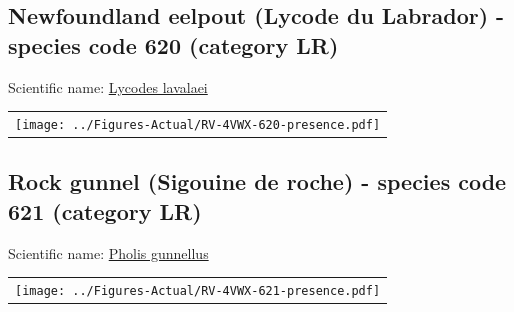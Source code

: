 \documentclass[12pt]{article}\usepackage[]{graphicx}\usepackage[]{color}
\begin{document}
\renewcommand\thefigure{\thesubsection\Alph{figure}}

\setcounter{figure}{0}

\hypertarget{sec:620}{%
\subsection{Newfoundland eelpout (Lycode du Labrador) - species code 620 (category LR)}\label{sec:620}}

  


Scientific name: \href{http://www.marinespecies.org/aphia.php?p=taxdetails\&id=127107}{Lycodes lavalaei} \newline
\begin{minipage}{1.0\textwidth}
 \begin{tabular}{c}
\texttt{[image: ../Figures-Actual/RV-4VWX-620-presence.pdf]} \\ 
\end{tabular} 
\end{minipage}
\clearpage

\renewcommand\thefigure{\thesubsection\Alph{figure}}

\setcounter{figure}{0}

\hypertarget{sec:621}{%
\subsection{Rock gunnel (Sigouine de roche) - species code 621 (category LR)}\label{sec:621}}

  


Scientific name: \href{http://www.marinespecies.org/aphia.php?p=taxdetails\&id=126996}{Pholis gunnellus} \newline
\begin{minipage}{1.0\textwidth}
 \begin{tabular}{c}
\texttt{[image: ../Figures-Actual/RV-4VWX-621-presence.pdf]} \\ 
\end{tabular} 
\end{minipage}
\clearpage

\renewcommand\thefigure{\thesubsection\Alph{figure}}
\end{document}
